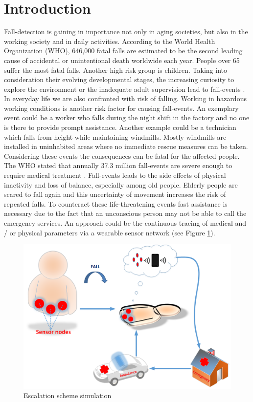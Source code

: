 \documentclass[review]{elsarticle}
\begin{document}

\section{Introduction}
Fall-detection is gaining in importance not only in aging societies, but also in the working society and in daily activities. According to the World Health Organization (WHO), 646,000 fatal falls are estimated to be the second leading cause of accidental or unintentional death worldwide each year. People over 65 suffer the most fatal falls. Another high risk group is children. Taking into consideration their evolving developmental stages, the increasing curiosity to explore the environment or the inadequate adult supervision lead to fall-events \cite{WHO2018}.
In everyday life we are also confronted with risk of falling. Working in hazardous working conditions is another risk factor for causing fall-events. An exemplary event could be a worker who falls during the night shift in the factory and no one is there to provide prompt assistance. Another example could be a technician which falls from height while maintaining windmills. Mostly windmills are installed in uninhabited areas where no immediate rescue measures can be taken. Considering these events the consequences can be fatal for the affected people. 
The WHO stated that annually 37.3 million fall-events are severe enough to require medical treatment \cite{WHO2018}. Fall-events leads to the side effects of physical inactivity and loss of balance, especially among old people. Elderly people are scared to fall again and this uncertainty of movement increases the risk of repeated falls. 
To counteract these life-threatening events fast assistance is necessary due to the fact that an unconscious person may not be able to call the emergency services. An approach could be the continuous tracing of medical and / or physical parameters via a wearable sensor network (see Figure \ref{fig:escalationscheme}).
\begin{figure}[!ht]
	\centering
	\includegraphics[scale=0.38]{Images/EscalationScheme}
	\caption[Escalation scheme]{Escalation scheme simulation~\cite{LaBlunda.2016,LaBlunda.2016b}}
	\label{fig:escalationscheme}
\end{figure}
\end{document}
